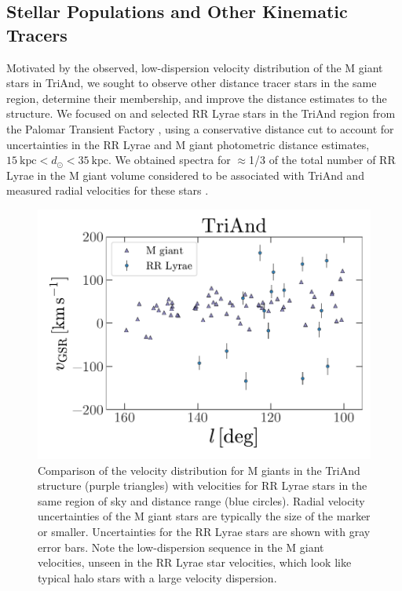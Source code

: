 \documentclass[galaxies,article,submit,moreauthors,pdftex,10pt,a4paper]{mdpi}
\newcommand{\kpc}{\mathrm{kpc}}
\begin{document}

\subsection{Stellar Populations and Other Kinematic Tracers}
 \label{sec:populations}
Motivated by the observed, low-dispersion velocity distribution of the M giant
stars in TriAnd, we sought to observe other distance tracer stars in the same
region, determine their membership, and improve the distance estimates to the
structure.
We focused on and selected RR Lyrae stars in the TriAnd region from the Palomar
Transient Factory \cite[PTF;][]{ptf}, using a conservative distance cut to
account for uncertainties in the RR Lyrae and M giant photometric distance
estimates, $15~\kpc < d_\odot < 35~\kpc$.
We obtained spectra for $\approx$1/3 of the total number of RR Lyrae in the M
giant volume considered to be associated with TriAnd and measured radial
velocities for these stars \cite{pricewhelan15}.

\begin{figure}[t]
\centering
\includegraphics[width=5 in]{figures/triand_rrlyrae}
\caption{\label{fig:apw}
Comparison of the velocity distribution for M giants in the TriAnd structure
(purple triangles) with velocities for RR Lyrae stars in the same region of sky
and distance range (blue circles).
Radial velocity uncertainties of the M giant stars are typically the size of the
marker or smaller.
Uncertainties for the RR Lyrae stars are shown with gray error bars.
Note the low-dispersion sequence in the M giant velocities, unseen in the RR
Lyrae star velocities, which look like typical halo stars with a large
velocity dispersion.
}
\end{figure}
\end{document}
